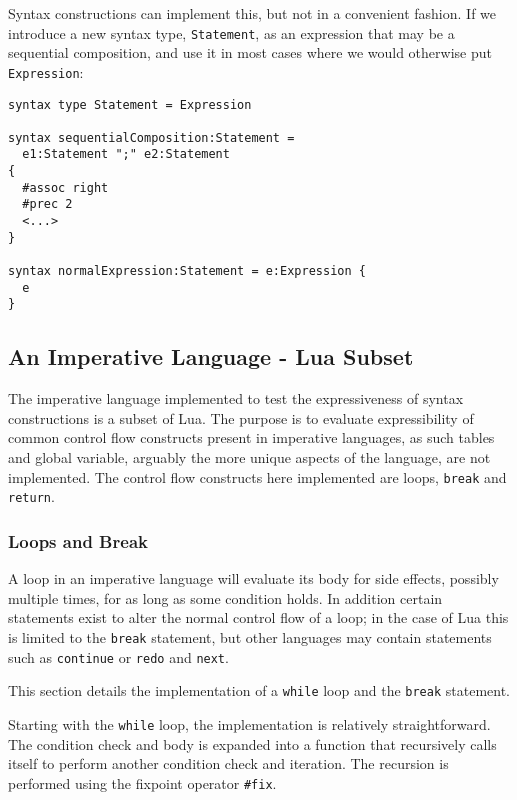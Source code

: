 \documentclass{kththesis}
\begin{document}
Syntax constructions can implement this, but not in a convenient fashion. If we introduce a new syntax type, \texttt{Statement}, as an expression that may be a sequential composition, and use it in most cases where we would otherwise put \texttt{Expression}:

\begin{verbatim}
syntax type Statement = Expression

syntax sequentialComposition:Statement =
  e1:Statement ";" e2:Statement
{
  #assoc right
  #prec 2
  <...>
}

syntax normalExpression:Statement = e:Expression {
  e
}
\end{verbatim}

\subsection{An Imperative Language - Lua Subset} \label{sec:imperative-eval}

The imperative language implemented to test the expressiveness of syntax constructions is a subset of Lua. %
The purpose is to evaluate expressibility of common control flow constructs present in imperative languages, as such tables and global variable, arguably the more unique aspects of the language, are not implemented. The control flow constructs here implemented are loops, \texttt{break} and \texttt{return}.

\subsubsection{Loops and Break} \label{sec:lua-loops-and-break}

A loop in an imperative language will evaluate its body for side effects, possibly multiple times, for as long as some condition holds. In addition certain statements exist to alter the normal control flow of a loop; in the case of Lua this is limited to the \texttt{break} statement, but other languages may contain statements such as \texttt{continue} or \texttt{redo} and \texttt{next}.

This section details the implementation of a \texttt{while} loop and the \texttt{break} statement.

Starting with the \texttt{while} loop, the implementation is relatively straightforward. The condition check and body is expanded into a function that recursively calls itself to perform another condition check and iteration. The recursion is performed using the fixpoint operator \texttt{#fix}.
\end{document}
